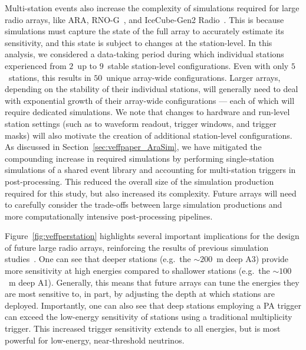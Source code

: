   Multi-station events also increase the complexity of simulations required for large radio arrays, like ARA, \mbox{RNO-G}~\citep{rnog_design}, and IceCube-Gen2 Radio~\citep{icecube_gen2}.
  This is because simulations must capture the state of the full array to accurately estimate its sensitivity, and this state is subject to changes at the station-level.
  In this analysis, we considered a data-taking period during which individual stations experienced from $2$~up to $9$~stable station-level configurations.
  Even with only $5$~stations, this results in $50$~unique array-wide configurations.
  Larger arrays, depending on the stability of their individual stations, will generally need to deal with exponential growth of their array-wide configurations --- each of which will require dedicated simulations.
  We note that changes to hardware and run-level station settings (such as to waveform readout, trigger windows, and trigger masks) will also motivate the creation of additional station-level configurations.
  As discussed in Section~\ref{sec:veffpaper_AraSim}, we have mitigated the compounding increase in required simulations by performing single-station simulations of a shared event library and accounting for multi-station triggers in post-processing.
  This reduced the overall size of the simulation production required for this study, but also increased its complexity.
  Future arrays will need to carefully consider the trade-offs between large simulation productions and more computationally intensive post-processing pipelines.

  Figure~\ref{fig:veffperstation} highlights several important implications for the design of future large radio arrays, reinforcing the results of previous simulation studies~\citep{rno_design-sims, nuradiomc2, icecube_gen2-radio-sensitivity}.
  One can see that deeper stations (e.g.\ the ${\sim}200$~m deep A3) provide more sensitivity at high energies compared to shallower stations (e.g.\ the ${\sim}100$~m deep A1).
  Generally, this means that future arrays can tune the energies they are most sensitive to, in part, by adjusting the depth at which stations are deployed.
  Importantly, one can also see that deep stations employing a PA trigger can exceed the low-energy sensitivity of stations using a traditional multiplicity trigger.
  This increased trigger sensitivity extends to all energies, but is most powerful for low-energy, near-threshold neutrinos.

